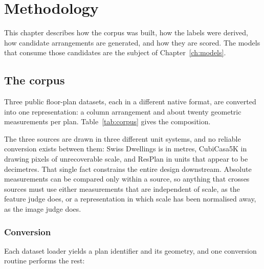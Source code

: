 \chapter{Methodology}
\label{ch:method}

This chapter describes how the corpus was built, how the labels were
derived, how candidate arrangements are generated, and how they are
scored. The models that consume those candidates are the subject of
Chapter~\ref{ch:models}.

\section{The corpus}
\label{sec:corpus}

Three public floor-plan datasets, each in a different native format, are
converted into one representation: a column arrangement and about twenty
geometric measurements per plan. Table~\ref{tab:corpus} gives the
composition.

\begin{table}[H]
\centering
\caption[Corpus composition]{Corpus composition. Median columns and median
regularity are computed after the labelling procedure of
Section~\ref{sec:labels}. ResPlan carries no per-wall thickness, so it
cannot take that procedure and is retained for descriptive purposes only.}
\label{tab:corpus}
\small

\end{table}

The three sources are drawn in three different unit systems, and no
reliable conversion exists between them: Swiss Dwellings is in metres,
CubiCasa5K in drawing pixels of unrecoverable scale, and ResPlan in units
that appear to be decimetres. That single fact constrains the entire
design downstream. Absolute measurements can be compared only within a
source, so anything that crosses sources must use either measurements
that are independent of scale, as the feature judge does, or a
representation in which scale has been normalised away, as the image judge
does.

\subsection{Conversion}

Each dataset loader yields a plan identifier and its geometry, and one
conversion routine performs the rest:

